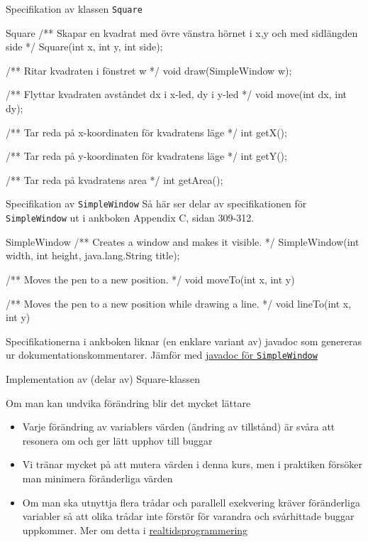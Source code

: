 \documentclass{lecturenotes}
\begin{document}
\begin{Slide}{Specifikation av klassen \texttt{Square}}
\begin{ClassSpec}{Square}
/** Skapar en kvadrat med övre vänstra hörnet i x,y och med sidlängden side  */
Square(int x, int y, int side);

/** Ritar kvadraten i fönstret w */
void draw(SimpleWindow w);

/** Flyttar kvadraten avståndet dx i x-led, dy i y-led */
void move(int dx, int dy);

/** Tar reda på x-koordinaten för kvadratens läge */
int getX();

/** Tar reda på y-koordinaten för kvadratens läge */
int getY();

/** Tar reda på kvadratens area */
int getArea();
\end{ClassSpec}
\end{Slide}

\begin{Slide}{Specifikation av \texttt{SimpleWindow}}
Så här ser delar av specifikationen för \texttt{SimpleWindow} ut i ankboken Appendix C, sidan 309-312.
\begin{ClassSpec}{SimpleWindow}
/** Creates a window and makes it visible. */
SimpleWindow(int width, int height, java.lang.String title);

/** Moves the pen to a new position. */
void moveTo(int x, int y)

/** Moves the pen to a new position while drawing a line. */
void lineTo(int x, int y)
\end{ClassSpec}
Specifikationerna i ankboken liknar (en enklare variant av) javadoc som genereras ur dokumentationskommentarer. Jämför med \href{http://fileadmin.cs.lth.se/cs/Education/EDA016/2015/doc/se/lth/cs/pt/window/SimpleWindow.html}{javadoc för \texttt{SimpleWindow}}
\end{Slide}

\begin{Slide}{Implementation av (delar av) Square-klassen}

\end{Slide}



\begin{Slide}{Om man kan undvika förändring blir det mycket lättare}
\begin{itemize}
\item Varje förändring av variablers värden (ändring av tillstånd) är svåra att resonera om och ger lätt upphov till buggar
\item Vi tränar mycket på att mutera värden i denna kurs, men i praktiken försöker man minimera föränderliga värden
\item Om man ska utnyttja flera trådar och parallell exekvering kräver föränderliga variabler  så att olika trådar inte förstör för varandra och svårhittade buggar uppkommer. Mer om detta i \href{http://cs.lth.se/eda040}{realtidsprogrammering}
\end{itemize}
\end{Slide}
\end{document}
